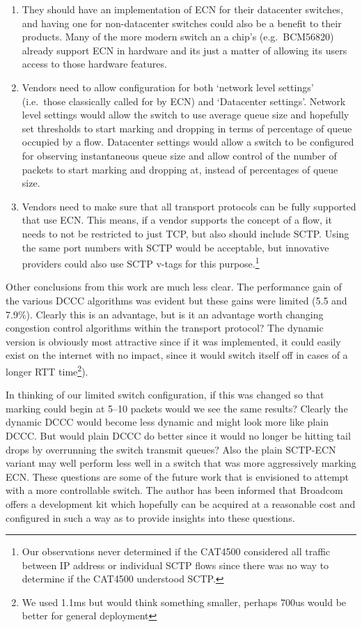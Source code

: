 \documentclass[12pt]{article}
\begin{document}
\begin{enumerate}

\item They should have an implementation of ECN for their datacenter
  switches, and having one
for non-datacenter switches could also be a benefit to their products. Many of the more modern switch an a chip's (e.g.~BCM56820)
already support ECN in hardware and its just a matter of allowing its users access to those
hardware features.

\item Vendors need to allow configuration for both `network level settings' (i.e.~those classically called
for by ECN) and `Datacenter settings'. Network level settings would allow the switch to use average queue
size and hopefully set thresholds to start marking and dropping in terms of percentage of queue occupied by
a flow. Datacenter settings would allow a switch to be configured for observing instantaneous queue size
and allow control of the number of packets to start marking and
dropping at, instead of percentages of
queue size.

\item Vendors need to make sure that all transport protocols can be fully supported that use ECN. This
means, if a vendor supports the concept of a flow, it needs to not be restricted to just TCP, but also should include SCTP. Using the same port
numbers with SCTP would be acceptable, but innovative providers could also use SCTP v-tags for this purpose.\footnote{Our observations
never determined if the CAT4500 considered all traffic between IP address or individual SCTP flows since there was
no way to determine if the CAT4500 understood SCTP.}

\end{enumerate}

Other conclusions from this work are much less clear. The performance gain of the various DCCC algorithms
was evident but these gains were limited (5.5 and 7.9\%). Clearly this is an advantage, but is it an advantage
worth changing congestion control algorithms within the transport protocol? The dynamic version is obviously most
attractive since if it was implemented, it could easily exist on the
internet with no impact, since it would switch itself
off in cases of a longer RTT time\footnote{We used 1.1ms but would think something smaller, perhaps 700us would
be better for general deployment}). 

In thinking of our limited switch configuration, if this was changed so that marking could begin at 5--10 packets
would we see the same results? Clearly the dynamic DCCC would become less dynamic and might look more
like plain DCCC. But would plain DCCC do better since it would no longer be hitting tail drops 
by overrunning the switch transmit queues? Also the plain SCTP-ECN variant may well perform less well 
in a switch that was more aggressively marking ECN. These questions are some of the future work that
is envisioned to attempt with a more controllable switch. The author has been informed that Broadcom
offers a development kit which hopefully can be acquired at a reasonable cost and configured in such
a way as to provide insights into these questions.
     
\end{document}
